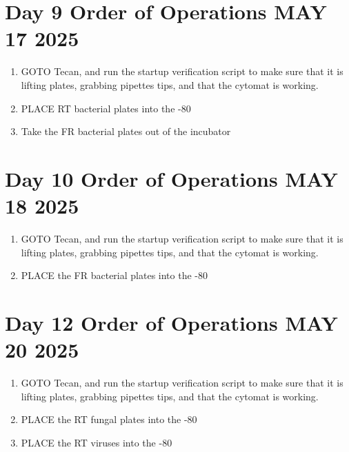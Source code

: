 \documentclass{article}
\begin{document}
\section*{Day 9 Order of Operations MAY 17 2025} \label{day8instructions}
\begin{enumerate}
    \item GOTO Tecan, and run the startup verification script to make sure that it is lifting plates, grabbing pipettes tips, and that the cytomat is working.
    \item PLACE RT bacterial plates into the -80
    \item Take the FR bacterial plates out of the incubator
\end{enumerate}

\section*{Day 10 Order of Operations MAY 18 2025} \label{day8instructions}
\begin{enumerate}
    \item GOTO Tecan, and run the startup verification script to make sure that it is lifting plates, grabbing pipettes tips, and that the cytomat is working. 
    \item PLACE the FR bacterial plates into the -80
\end{enumerate}

\section*{Day 12 Order of Operations MAY 20 2025} \label{day8instructions}
\begin{enumerate}
    \item GOTO Tecan, and run the startup verification script to make sure that it is lifting plates, grabbing pipettes tips, and that the cytomat is working. 
    \item PLACE the RT fungal plates into the -80
    \item PLACE the RT viruses into the -80
\end{enumerate}
\end{document}
